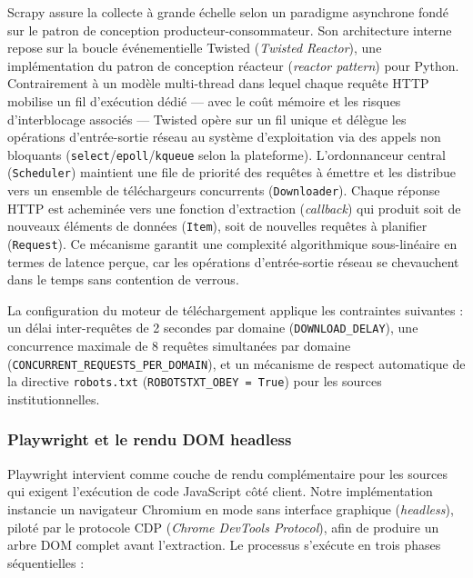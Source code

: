Scrapy assure la collecte à grande échelle selon un paradigme asynchrone fondé sur le patron de conception producteur-consommateur. Son architecture interne repose sur la boucle événementielle Twisted (\textit{Twisted Reactor}), une implémentation du patron de conception réacteur (\textit{reactor pattern}) pour Python. Contrairement à un modèle multi-thread dans lequel chaque requête HTTP mobilise un fil d'exécution dédié --- avec le coût mémoire et les risques d'interblocage associés --- Twisted opère sur un fil unique et délègue les opérations d'entrée-sortie réseau au système d'exploitation via des appels non bloquants (\texttt{select}/\texttt{epoll}/\texttt{kqueue} selon la plateforme). L'ordonnanceur central (\texttt{Scheduler}) maintient une file de priorité des requêtes à émettre et les distribue vers un ensemble de téléchargeurs concurrents (\texttt{Downloader}). Chaque réponse HTTP est acheminée vers une fonction d'extraction (\textit{callback}) qui produit soit de nouveaux éléments de données (\texttt{Item}), soit de nouvelles requêtes à planifier (\texttt{Request}). Ce mécanisme garantit une complexité algorithmique sous-linéaire en termes de latence perçue, car les opérations d'entrée-sortie réseau se chevauchent dans le temps sans contention de verrous.

La configuration du moteur de téléchargement applique les contraintes suivantes : un délai inter-requêtes de 2 secondes par domaine (\texttt{DOWNLOAD\_DELAY}), une concurrence maximale de 8 requêtes simultanées par domaine (\texttt{CONCURRENT\_REQUESTS\_PER\_DOMAIN}), et un mécanisme de respect automatique de la directive \texttt{robots.txt} (\texttt{ROBOTSTXT\_OBEY = True}) pour les sources institutionnelles.

\subsubsection{Playwright et le rendu DOM headless}

Playwright intervient comme couche de rendu complémentaire pour les sources qui exigent l'exécution de code JavaScript côté client. Notre implémentation instancie un navigateur Chromium en mode sans interface graphique (\textit{headless}), piloté par le protocole CDP (\textit{Chrome DevTools Protocol}), afin de produire un arbre DOM complet avant l'extraction. Le processus s'exécute en trois phases séquentielles :


